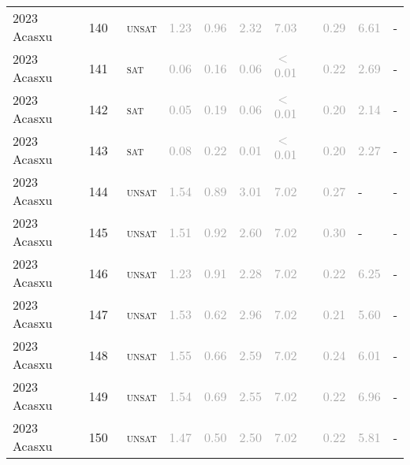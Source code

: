 \begin{center}
{\begin{longtable}{@{}llllllllll@{}}
2023 Acasxu & 140 & ~\textsc{unsat} & \textcolor{darkgray}{1.23} & \textcolor{darkgray}{0.96} & \textcolor{darkgray}{2.32} & \textcolor{darkgray}{7.03} & \textcolor{darkgray}{0.29} & \textcolor{darkgray}{6.61} & - \\
2023 Acasxu & 141 & ~\textsc{sat} & \textcolor{darkgray}{0.06} & \textcolor{darkgray}{0.16} & \textcolor{darkgray}{0.06} & \textcolor{darkgray}{$<$0.01} & \textcolor{darkgray}{0.22} & \textcolor{darkgray}{2.69} & - \\
2023 Acasxu & 142 & ~\textsc{sat} & \textcolor{darkgray}{0.05} & \textcolor{darkgray}{0.19} & \textcolor{darkgray}{0.06} & \textcolor{darkgray}{$<$0.01} & \textcolor{darkgray}{0.20} & \textcolor{darkgray}{2.14} & - \\
2023 Acasxu & 143 & ~\textsc{sat} & \textcolor{darkgray}{0.08} & \textcolor{darkgray}{0.22} & \textcolor{darkgray}{0.01} & \textcolor{darkgray}{$<$0.01} & \textcolor{darkgray}{0.20} & \textcolor{darkgray}{2.27} & - \\
2023 Acasxu & 144 & ~\textsc{unsat} & \textcolor{darkgray}{1.54} & \textcolor{darkgray}{0.89} & \textcolor{darkgray}{3.01} & \textcolor{darkgray}{7.02} & \textcolor{darkgray}{0.27} & - & - \\
2023 Acasxu & 145 & ~\textsc{unsat} & \textcolor{darkgray}{1.51} & \textcolor{darkgray}{0.92} & \textcolor{darkgray}{2.60} & \textcolor{darkgray}{7.02} & \textcolor{darkgray}{0.30} & - & - \\
2023 Acasxu & 146 & ~\textsc{unsat} & \textcolor{darkgray}{1.23} & \textcolor{darkgray}{0.91} & \textcolor{darkgray}{2.28} & \textcolor{darkgray}{7.02} & \textcolor{darkgray}{0.22} & \textcolor{darkgray}{6.25} & - \\
2023 Acasxu & 147 & ~\textsc{unsat} & \textcolor{darkgray}{1.53} & \textcolor{darkgray}{0.62} & \textcolor{darkgray}{2.96} & \textcolor{darkgray}{7.02} & \textcolor{darkgray}{0.21} & \textcolor{darkgray}{5.60} & - \\
2023 Acasxu & 148 & ~\textsc{unsat} & \textcolor{darkgray}{1.55} & \textcolor{darkgray}{0.66} & \textcolor{darkgray}{2.59} & \textcolor{darkgray}{7.02} & \textcolor{darkgray}{0.24} & \textcolor{darkgray}{6.01} & - \\
2023 Acasxu & 149 & ~\textsc{unsat} & \textcolor{darkgray}{1.54} & \textcolor{darkgray}{0.69} & \textcolor{darkgray}{2.55} & \textcolor{darkgray}{7.02} & \textcolor{darkgray}{0.22} & \textcolor{darkgray}{6.96} & - \\
2023 Acasxu & 150 & ~\textsc{unsat} & \textcolor{darkgray}{1.47} & \textcolor{darkgray}{0.50} & \textcolor{darkgray}{2.50} & \textcolor{darkgray}{7.02} & \textcolor{darkgray}{0.22} & \textcolor{darkgray}{5.81} & - \\

\end{longtable}}
\end{center}
